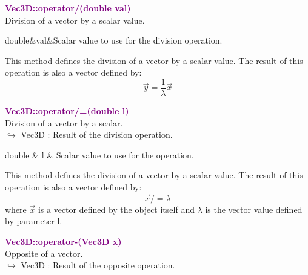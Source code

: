\textcolor{purple}{\textbf{Vec3D::operator/(double val)}}\label{Vec3D::operator/(double val)}\\
Division of a vector by a scalar value.

\begin{tcolorbox}[width=\textwidth,myArgs,tabularx={ll|R}]
double&val&Scalar value to use for the division operation.
\end{tcolorbox}

This method defines the division of a vector by a scalar value.
The result of this operation is also a vector defined by:
\begin{equation*}
\overrightarrow{y} = \frac{1}{\lambda}\overrightarrow{x}
\end{equation*}

\textcolor{purple}{\textbf{Vec3D::operator/=(double l)}}\label{Vec3D::operator/=(double l)}\\
Division of a vector by a scalar.\\ \hspace*{10mm}$\hookrightarrow$ Vec3D : Result of the division operation.

\begin{tcolorbox}[width=\textwidth,myArgs,tabularx={ll|R}]
double & l & Scalar value to use for the operation.
\end{tcolorbox}

This method defines the division of a vector by a scalar value.
The result of this operation is also a vector defined by:
\begin{equation*}
\overrightarrow{x} /= \lambda
\end{equation*}
where $\overrightarrow{x}$ is a vector defined by the object itself and $\lambda$ is the vector value defined by parameter l.

\textcolor{purple}{\textbf{Vec3D::operator-(Vec3D x)}}\label{Vec3D::operator-(Vec3D x)}\\
Opposite of a vector.\\ \hspace*{10mm}$\hookrightarrow$ Vec3D : Result of the opposite operation.

